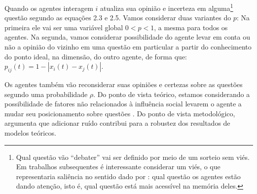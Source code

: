 Quando os agentes interagem \(i\) atualiza sua opinião e incerteza em
alguma\footnote{Qual questão vão ``debater'' vai ser definido por meio de um
  sorteio sem viés. Em trabalhos subsequentes é interessante considerar um viés,
  o que representaria saliência no sentido dado por
  : qual questão os agentes estão dando atenção,
  isto é, qual questão está mais acessível na memória deles.} questão segundo as
equações 2.3 e 2.5. Vamos considerar duas variantes do \(p\): Na primeira ele
vai ser uma variável global \(0 < p < 1 \), a mesma para todos os agentes. Na
segunda, vamos considerar possibilidade do agente levar em conta ou não a
opinião do vizinho em uma questão em particular a partir do conhecimento do
ponto ideal, na dimensão, do outro agente, de forma que: \(p_{ij}(t) = 1 -
|x_i(t) - x_j(t)|\).

Os agentes também vão reconsiderar suas opiniões e certezas sobre as questões
segundo uma probabilidade \(\rho\). Do ponto de vista teórico, estamos considerando
a possibilidade de fatores não relacionados à influência social levarem o agente
a mudar seu posicionamento sobre questões \cite{flache2017, lorenz2017modeling}.
Do ponto de vista metodológico,  argumenta que
adicionar ruído contribui para a robustez dos resultados de modelos teóricos. 

